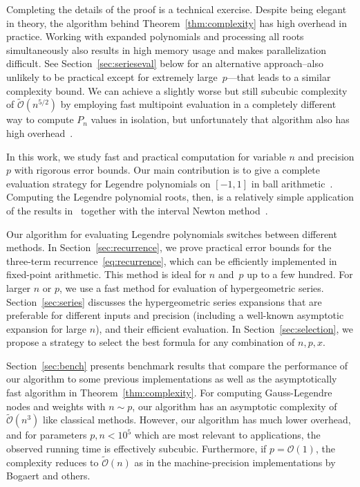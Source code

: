 \documentclass{siamart0216}
\newcommand{\OO}{\mathcal{O}}
\newcommand{\OOtilde}{\widetilde{\mathcal{O}}}
\begin{document}
Completing the details
of the proof is a technical exercise.
Despite being elegant in theory,
the algorithm behind Theorem~\ref{thm:complexity} has high overhead
in practice. Working with expanded polynomials and
processing all roots simultaneously also results in high memory usage and
makes parallelization difficult.
See Section~\ref{sec:serieseval} below for an alternative approach--also
unlikely to be practical except for extremely large~$p$---that leads to a
similar complexity bound.
We can achieve a slightly worse but still subcubic
complexity of $\OOtilde(n^{5/2})$
by employing
fast multipoint evaluation in a completely different way
to compute $P_n$ values in isolation,
but unfortunately that algorithm
also has high overhead~\cite{Johansson2014rectangular}.

In this work, we study fast and practical computation for variable $n$
and precision $p$ with rigorous error bounds.
Our main contribution is to give a complete evaluation strategy
for Legendre polynomials on $[-1,1]$ in ball arithmetic~\cite{vdH:ball,Johansson2017arb}.
Computing the Legendre polynomial roots, then,
is a relatively simple application of the results
in~\cite{petras1999computation} together with
the interval Newton method~\cite{moore1979methods}.

Our algorithm for evaluating Legendre polynomials switches between
different methods.
In Section~\ref{sec:recurrence}, we prove practical error bounds for
the three-term recurrence~\eqref{eq:recurrence}, which can be
efficiently implemented in fixed-point arithmetic.
This method is ideal for $n$ and~$p$ up to a few hundred.
For larger $n$ or $p$, we use a fast method for evaluation
of hypergeometric series.
Section~\ref{sec:series} discusses the hypergeometric series
expansions that are preferable for different inputs and precision
(including a well-known asymptotic expansion for large $n$),
and their efficient evaluation.
In Section \ref{sec:selection}, we propose a strategy to select the
best formula for any combination of $n, p, x$.

Section~\ref{sec:bench} presents benchmark results
that compare the performance
of our algorithm
to some previous implementations
as well as the asymptotically fast algorithm in Theorem~\ref{thm:complexity}.
For computing Gauss-Legendre nodes and weights with $n \sim p$,
our algorithm has an asymptotic complexity of $\OOtilde(n^3)$ like
classical methods. However, our algorithm has much lower overhead,
and for parameters $p, n < 10^5$ which are most relevant to applications,
the observed running time is effectively subcubic.
Furthermore, if $p = \OO(1)$, the complexity reduces to $\OOtilde(n)$
as in the machine-precision implementations by Bogaert and others.
\end{document}
